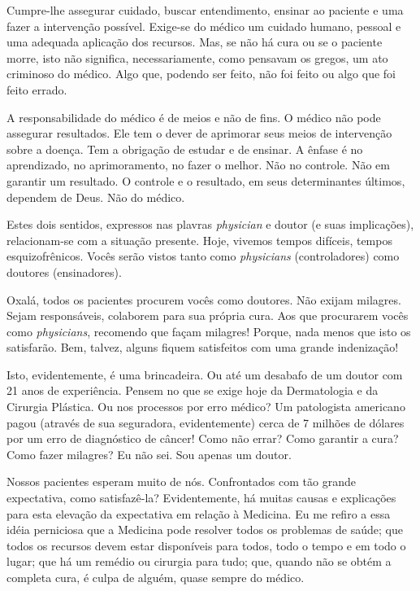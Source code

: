 \documentclass[pdftex, brazil, 12pt, oneside]{article}
\newcommand{\ingles}[1]{\textit{#1}}
\begin{document}
Cumpre-lhe assegurar cuidado, buscar entendimento, ensinar ao paciente e uma fazer a intervenção
possível. Exige-se do médico um cuidado humano, pessoal e uma adequada aplicação dos recursos. Mas,
se não há cura ou se o paciente morre, isto não significa, necessariamente, como pensavam os gregos,
um ato criminoso do médico. Algo que, podendo ser feito, não foi feito ou algo que foi feito errado.

A responsabilidade do médico é de meios e não de fins. O médico não pode assegurar resultados.
Ele tem o dever de aprimorar seus meios de intervenção sobre a doença. Tem a obrigação de estudar
e de ensinar. A ênfase é no aprendizado, no aprimoramento, no fazer o melhor. Não no controle.
Não em garantir um resultado. O controle e o resultado, em seus determinantes últimos,
dependem de Deus. Não do médico.

Estes dois sentidos, expressos nas plavras \ingles{physician} e doutor (e suas implicações),
relacionam-se com a situação presente. Hoje, vivemos tempos difíceis, tempos esquizofrênicos.
Vocês serão vistos tanto como \ingles{physicians} (controladores) como doutores (ensinadores).

Oxalá, todos os pacientes procurem vocês como doutores. Não exijam milagres. Sejam responsáveis,
colaborem para sua própria cura. Aos que procurarem vocês como \ingles{physicians}, recomendo que
façam milagres! Porque, nada menos que isto os satisfarão. Bem, talvez, alguns fiquem satisfeitos
com uma grande indenização!

Isto, evidentemente, é uma brincadeira. Ou até um desabafo de um doutor com 21 anos de experiência.
Pensem no que se exige hoje da Dermatologia e da Cirurgia Plástica. Ou nos processos por erro médico?
Um patologista americano pagou (através de sua seguradora, evidentemente) cerca de 7 milhões de
dólares por um erro de diagnóstico de câncer! Como não errar? Como garantir a cura? Como fazer
milagres? Eu não sei. Sou apenas um doutor.

Nossos pacientes esperam muito de nós. Confrontados com tão grande expectativa, como satisfazê-la?
Evidentemente, há muitas causas e explicações para esta elevação da expectativa em relação à Medicina.
Eu me refiro a essa idéia perniciosa que a Medicina pode resolver todos os problemas de saúde;
que todos os recursos devem estar disponíveis para todos, todo o tempo e em todo o lugar; que há um
remédio ou cirurgia para tudo; que, quando não se obtém a completa cura, é culpa de alguém,
quase sempre do médico.
\end{document}
